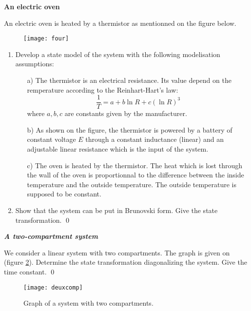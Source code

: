 \begin{exercice}{\bf An electric oven}

An electric oven is heated by a thermistor as mentionned on the figure below.
\begin{figure}[h]
\begin{center}
\texttt{[image: four]}
\label{four}
\end{center}
\vspace{-5mm}
\end{figure}
\begin{enumerate}
\item Develop a state model of the system with the following modelisation assumptions: 
\begin{itemize}
\item[a)] The thermistor is an electrical resistance. Its value depend on the remperature according to the Reinhart-Hart's law:
\begin{equation*}
\dfrac{1}{T} = a + b \ln R + c (\ln R)^3
\end{equation*}
where $a, b, c$ are constants given by the manufacturer.
\item [b)] As shown on the figure, the thermistor is powered by a battery of constant voltage $E$ through a constant inductance (linear)  and 
an adjustable linear resistance which is the input of the system.
\item[c)] The oven is heated by the thermistor. The heat which is lost through the wall of the oven is proportionnal to the difference between the inside temperature and the outside temperature. The outside temperature is supposed to be constant.
\end{itemize}
\item Show that the system can be put in Brunovski form. Give the state transformation. \qed
\end{enumerate}
\end{exercice}
\vv

\begin{exercice}{\bf \em A two-compartment system}

We consider a linear system with two compartments. The graph is given on  (figure  \ref{Fig:deuxcomp}).
Determine the state transformation diagonalizing the system. Give the time constant. \qed
\begin{figure}[h] 
   \centering
   \texttt{[image: deuxcomp]} 
   \caption{Graph of a system with two compartments.}
   \label{Fig:deuxcomp}
\end{figure}
\end{exercice}


